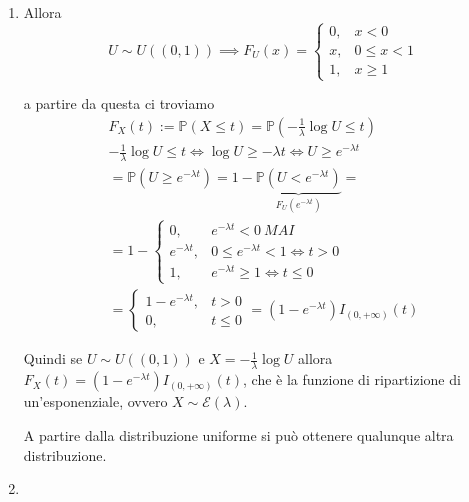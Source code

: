 \subsubsection{}
\begin{enumerate}
\item Allora\begin{equation*}
U\sim U\left(\left( 0,1\right)\right) \implies F_{U}\left( x\right) =\begin{cases}
0, & x< 0\\
x, & 0\leq x< 1\\
1, & x\geq 1
\end{cases}
\end{equation*}

a partire da questa ci troviamo\begin{gather*}
F_{X}\left( t\right) :=\mathbb{P}\left( X\leq t\right) =\mathbb{P}\left( -\frac{1}{\lambda }\log U\leq t\right)\\
-\frac{1}{\lambda }\log U\leq t\iff \log U\geq -\lambda t\iff U\geq e^{-\lambda t}\\
=\mathbb{P}\left( U\geq e^{-\lambda t}\right) =1-\underbrace{\mathbb{P}\left( U< e^{-\lambda t}\right)}_{F_{U}\left( e^{-\lambda t}\right)} =\\
=1-\begin{cases}
0, & e^{-\lambda t} < 0\ MAI\\
e^{-\lambda t} , & 0\leq e^{-\lambda t} < 1\iff t >0\\
1, & e^{-\lambda t} \geq 1\iff t\leq 0
\end{cases}\\
=\begin{cases}
1-e^{-\lambda t} , & t >0\\
0, & t\leq 0
\end{cases} =\left( 1-e^{-\lambda t}\right) I_{\left( 0,+\infty \right)}\left( t\right)
\end{gather*}

Quindi se $U\sim U\left(\left( 0,1\right)\right)$ e $X=-\frac{1}{\lambda }\log U$ allora $F_{X}\left( t\right) =\left( 1-e^{-\lambda t}\right) I_{\left( 0,+\infty \right)}\left( t\right)$, che è la funzione di ripartizione di un'esponenziale, ovvero $X\sim \mathcal{E}\left( \lambda \right)$.

A partire dalla distribuzione uniforme si può ottenere qualunque altra distribuzione.
\item 
\end{enumerate}
\subsection{}

